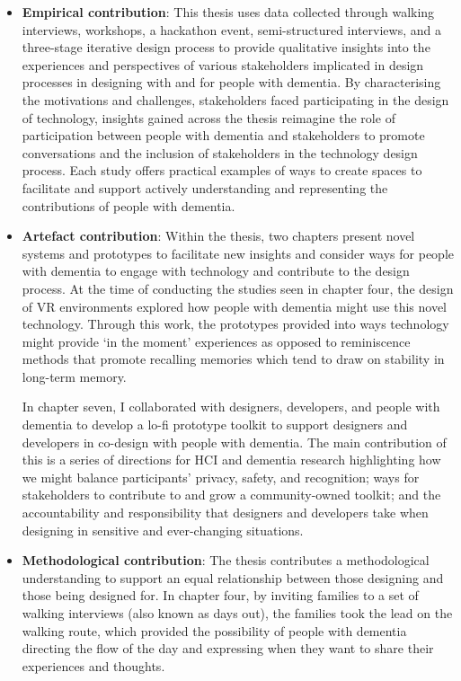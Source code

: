 \begin{itemize}
    \item \textbf{Empirical contribution}: This thesis uses data collected through walking interviews, workshops, a hackathon event, semi-structured interviews, and a three-stage iterative design process to provide qualitative insights into the experiences and perspectives of various stakeholders implicated in design processes in designing with and for people with dementia. By characterising the motivations and challenges, stakeholders faced participating in the design of technology, insights gained across the thesis reimagine the role of participation between people with dementia and stakeholders to promote conversations and the inclusion of stakeholders in the technology design process. Each study offers practical examples of ways to create spaces to facilitate and support actively understanding and representing the contributions of people with dementia.

    
    \item \textbf{Artefact contribution}: Within the thesis, two chapters present novel systems and prototypes to facilitate new insights and consider ways for people with dementia to engage with technology and contribute to the design process. At the time of conducting the studies seen in chapter four, the design of VR environments explored how people with dementia might use this novel technology. Through this work, the prototypes provided into ways technology might provide `in the moment' experiences as opposed to reminiscence methods that promote recalling memories which tend to draw on stability in long-term memory.

    In chapter seven, I collaborated with designers, developers, and people with dementia to develop a lo-fi prototype toolkit to support designers and developers in co-design with people with dementia. The main contribution of this is a series of directions for HCI and dementia research highlighting how we might balance participants’ privacy, safety, and recognition; ways for stakeholders to contribute to and grow a community-owned toolkit; and the accountability and responsibility that designers and developers take when designing in sensitive and ever-changing situations.

    
    \item \textbf{Methodological contribution}:  The thesis contributes a methodological understanding to support an equal relationship between those designing and those being designed for. In chapter four, by inviting families to a set of walking interviews (also known as days out), the families took the lead on the walking route, which provided the possibility of people with dementia directing the flow of the day and expressing when they want to share their experiences and thoughts.


\end{itemize}
